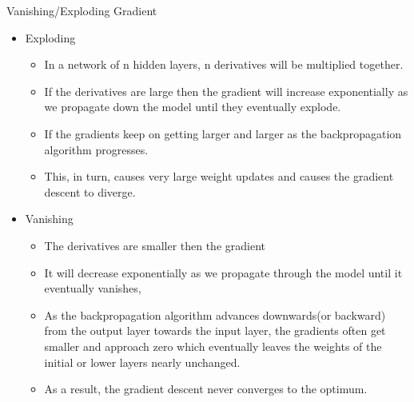 \begin{frame}{Vanishing/Exploding Gradient}
    \begin{itemize}
        \item Exploding
        \begin{itemize}
            \item In a network of n hidden layers, n derivatives will be multiplied together.
            \item If the derivatives are large then the gradient will increase exponentially as we propagate down the model until they eventually explode.
            \item If the gradients keep on getting larger and larger as the backpropagation algorithm progresses. 
            \item This, in turn, causes very large weight updates and causes the gradient descent to diverge. 
        \end{itemize}
        \item Vanishing
        \begin{itemize}
            \item The derivatives are smaller then the gradient
            \item It will decrease exponentially as we propagate through the model until it eventually vanishes,
            \item As the backpropagation algorithm advances downwards(or backward) from the output layer towards the input layer, the gradients often get smaller and approach zero which eventually leaves the weights of the initial or lower layers nearly unchanged.
            \item As a result, the gradient descent never converges to the optimum. 
        \end{itemize}
    \end{itemize}
\end{frame}

